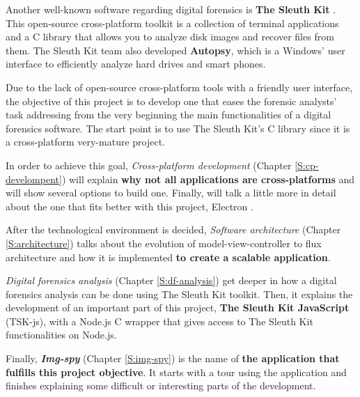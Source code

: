 Another well-known software regarding digital forensics is \textbf{The Sleuth
Kit} \cite{tsk-web}. This open-source cross-platform toolkit is a collection 
of terminal applications and a C library that allows you to analyze disk images
and recover files from them. The Sleuth Kit team also developed
\textbf{Autopsy}, which is a Windows' user interface to efficiently analyze
hard drives and smart phones.

Due to the lack of open-source cross-platform tools with a friendly user
interface, the objective of this project is to develop one that eases the
forensic analysts' task addressing from the very beginning the main
functionalities of a digital forensics software. The start point is to use The
Sleuth Kit's C library  \cite{tsk-web} since it is a cross-platform very-mature
project.

In order to achieve this goal, \textit{Cross-platform development} (Chapter
\ref{S:cp-develompent}) will explain \textbf{why not all applications are
cross-platforms} and will show several options to build one. Finally, will talk
a little more in detail about the one that fits better with this project,
Electron \cite{electron-web}.

After the technological environment is decided, \textit{Software architecture}
(Chapter \ref{S:architecture}) talks about the evolution of 
model-view-controller to flux architecture and how it is implemented \textbf{to 
create a scalable application}.

\textit{Digital forensics analysis} (Chapter \ref{S:df-analysis}) get deeper in
how a digital forensics analysis can be done using The Sleuth Kit toolkit. Then,
it explains the development of an important part of this project, \textbf{The
Sleuth Kit JavaScript} (TSK-js), with a Node.js \cite{nodejs-web} C wrapper
that gives access to The Sleuth Kit functionalities on Node.js.

Finally, \textbf{\textit{Img-spy}} (Chapter \ref{S:img-spy}) is the name of
\textbf{the application that fulfills this project objective}. It starts with a
tour using the application and finishes explaining some difficult or interesting
parts of the development.

